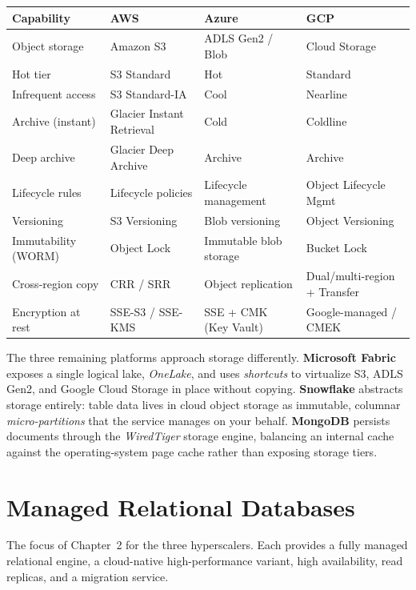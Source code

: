 \begin{center}
\footnotesize
\begin{tabular}{@{}p{2.8cm}p{3.2cm}p{3.2cm}p{3.2cm}@{}}
\toprule
\textbf{Capability} & \textbf{AWS} & \textbf{Azure} & \textbf{GCP} \\
\midrule
Object storage & Amazon S3 & ADLS Gen2 / Blob & Cloud Storage \\
Hot tier & S3 Standard & Hot & Standard \\
Infrequent access & S3 Standard-IA & Cool & Nearline \\
Archive (instant) & Glacier Instant Retrieval & Cold & Coldline \\
Deep archive & Glacier Deep Archive & Archive & Archive \\
Lifecycle rules & Lifecycle policies & Lifecycle management & Object Lifecycle Mgmt \\
Versioning & S3 Versioning & Blob versioning & Object Versioning \\
Immutability (WORM) & Object Lock & Immutable blob storage & Bucket Lock \\
Cross-region copy & CRR / SRR & Object replication & Dual/multi-region + Transfer \\
Encryption at rest & SSE-S3 / SSE-KMS & SSE + CMK (Key Vault) & Google-managed / CMEK \\
\bottomrule
\end{tabular}
\end{center}

\noindent The three remaining platforms approach storage differently.
\textbf{Microsoft Fabric} exposes a single logical lake, \emph{OneLake}, and uses
\emph{shortcuts} to virtualize S3, ADLS Gen2, and Google Cloud Storage in place without copying.
\textbf{Snowflake} abstracts storage entirely: table data lives in cloud object storage as
immutable, columnar \emph{micro-partitions} that the service manages on your behalf.
\textbf{MongoDB} persists documents through the \emph{WiredTiger} storage engine, balancing an
internal cache against the operating-system page cache rather than exposing storage tiers.

\section{Managed Relational Databases}
%
The focus of Chapter~2 for the three hyperscalers. Each provides a fully managed relational
engine, a cloud-native high-performance variant, high availability, read replicas, and a
migration service.

